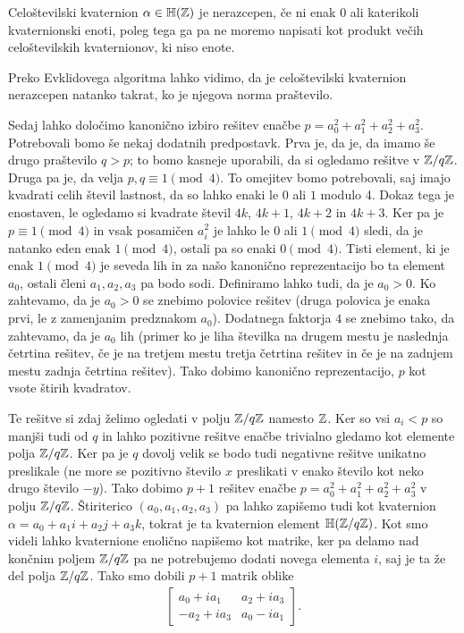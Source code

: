 \begin{definicija}
    Celoštevilski kvaternion \(\alpha\in \mathbb H(\mathbb Z)\) je nerazcepen, če ni enak \(0\) ali katerikoli kvaternionski enoti, poleg tega ga pa ne moremo napisati kot produkt večih celoštevilskih kvaternionov, ki niso enote.
\end{definicija}
Preko Evklidovega algoritma lahko vidimo, da je celoštevilski kvaternion nerazcepen natanko takrat, ko je njegova norma praštevilo.

Sedaj lahko določimo kanonično izbiro rešitev enačbe \(p=a_0^2 + a_1^2 + a_2^2 + a_3^2\). Potrebovali bomo še nekaj dodatnih predpostavk. Prva je, da je, da imamo še drugo praštevilo \(q>p\); to bomo kasneje uporabili, da si ogledamo rešitve v \(\mathbb Z/q\mathbb Z\). Druga pa je, da velja \(p,q \equiv 1 \pmod 4\). To omejitev bomo potrebovali, saj imajo kvadrati celih števil lastnost, da so lahko enaki le \(0\) ali \(1\) modulo 4. Dokaz tega je enostaven, le ogledamo si kvadrate števil \(4k\), \(4k+1\), \(4k+2\) in \(4k+3\). Ker pa je \(p\equiv 1 \pmod 4\) in vsak posamičen \(a_i^2\) je lahko le \(0\) ali \(1\pmod 4\) sledi, da je natanko eden enak \(1\pmod4\), ostali pa so enaki \(0\pmod 4\). Tisti element, ki je enak \(1\pmod4\) je seveda lih in za našo kanonično reprezentacijo bo ta element \(a_0\), ostali členi \(a_1, a_2, a_3\) pa bodo sodi. Definiramo lahko tudi, da je \(a_0>0\). Ko zahtevamo, da je \(a_0>0\) se znebimo polovice rešitev (druga polovica je enaka prvi, le z zamenjanim predznakom \(a_0\)). Dodatnega faktorja \(4\) se znebimo tako, da zahtevamo, da je \(a_0\) lih (primer ko je liha številka na drugem mestu je naslednja četrtina rešitev, če je na tretjem mestu tretja četrtina rešitev in če je na zadnjem mestu zadnja četrtina rešitev). Tako dobimo kanonično reprezentacijo, \(p\) kot vsote štirih kvadratov.

Te rešitve si zdaj želimo ogledati v polju \(\mathbb Z/q\mathbb Z\) namesto \(\mathbb Z\). Ker so vsi \(a_i<p\) so manjši tudi od \(q\) in lahko pozitivne rešitve enačbe trivialno gledamo kot elemente polja \(\mathbb Z/q\mathbb Z\). Ker pa je \(q\) dovolj velik se bodo tudi negativne rešitve unikatno preslikale (ne more se pozitivno število \(x\) preslikati v enako število kot neko drugo število \(-y\)). Tako dobimo \(p+1\) rešitev enačbe \(p=a_0^2 + a_1^2 + a_2^2 + a_3^2\) v polju \(\mathbb Z/q\mathbb Z\). Štiriterico \((a_0, a_1, a_2, a_3)\) pa lahko zapišemo tudi kot kvaternion \(\alpha = a_0 + a_1i + a_2j + a_3k\), tokrat je ta kvaternion element \(\mathbb H(\mathbb Z/q\mathbb Z)\). Kot smo videli lahko kvaternione enolično napišemo kot matrike, ker pa delamo nad končnim poljem \(\mathbb Z/q\mathbb Z\) pa ne potrebujemo dodati novega elementa \(i\), saj je ta že del polja \(\mathbb Z/q\mathbb Z\). Tako smo dobili \(p+1\) matrik oblike
\begin{align*}
    \begin{bmatrix}
        a_0 +ia_1 & a_2+ia_3 \\
        -a_2+ia_3 & a_0-ia_1
    \end{bmatrix}.
\end{align*}

